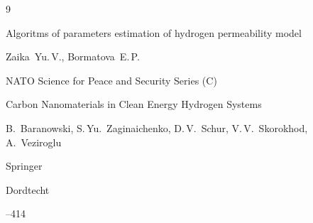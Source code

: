 \begin{thebibliography}{9}

\paper Algoritms of parameters estimation of hydrogen permeability model

\by Zaika~Yu.\,V., Bormatova~E.\,P.

\serial NATO Science for Peace and Security Series (C)

\inbook Carbon Nanomaterials in Clean Energy Hydrogen Systems

\eds B.~Baranowski, S.\,Yu.~Zaginaichenko, D.\,V.~Schur, V.\,V.~Skorokhod, A.~Veziroglu

\publ Springer

\publaddr Dordtecht


--414







\end{thebibliography}



\noindent

\hskip6.5cm \thedate \par\noindent

\hskip6.5cm\therevdate\par








\makeengtitle



\newpage



%

